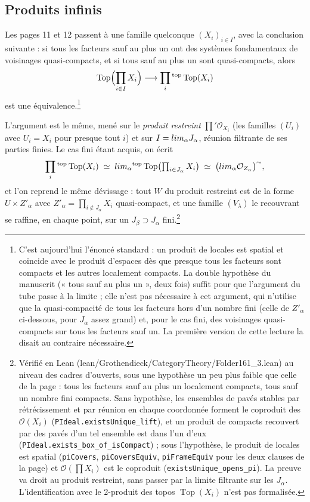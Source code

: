 \documentclass[11pt,a4paper]{article}
\begin{document}
\subsection*{Produits infinis}

Les pages 11 et 12 passent à une famille quelconque $(X_{i})_{i \in I}$, avec
la conclusion suivante : si tous les facteurs sauf au plus un ont des systèmes
fondamentaux de voisinages quasi-compacts, et si tous sauf au plus un sont
quasi-compacts, alors
\[
\operatorname{Top}\Bigl(\prod_{i \in I} X_{i}\Bigr) \longrightarrow
\prod_{i}{}^{\mathrm{top}} \operatorname{Top}(X_{i})
\]
est une équivalence.\footnote{C'est aujourd'hui l'énoncé standard : un produit
de locales est spatial et coïncide avec le produit d'espaces dès que presque
tous les facteurs sont compacts et les autres localement compacts. La double
hypothèse du manuscrit (« tous sauf au plus un », deux fois) suffit pour que
l'argument du tube passe à la limite ; elle n'est pas nécessaire à cet
argument, qui n'utilise que la quasi-compacité de tous les facteurs hors d'un
nombre fini (celle de $Z'_{\alpha}$ ci-dessous, pour $J_{\alpha}$ assez grand)
et, pour le cas fini, des voisinages quasi-compacts sur tous les facteurs
sauf un. La première version de cette lecture la disait au contraire
nécessaire.}

L'argument est le même, mené sur le \emph{produit restreint}
$\prod' \mathcal{O}_{X_{i}}$ (les familles $(U_{i})$ avec $U_{i} = X_{i}$ pour
presque tout $i$) et sur $I = \varinjlim_{\alpha} J_{\alpha}$, réunion filtrante
de ses parties finies. Le cas fini étant acquis, on écrit
\[
\prod_{i}{}^{\mathrm{top}} \operatorname{Top}(X_{i})
\;\simeq\; \varprojlim_{\alpha}{}^{\mathrm{top}}
\operatorname{Top}\bigl(\textstyle\prod_{i \in J_{\alpha}} X_{i}\bigr)
\;\simeq\; \bigl(\varinjlim_{\alpha} \mathcal{O}_{Z_{\alpha}}\bigr)^{\sim},
\]
et l'on reprend le même dévissage : tout $W$ du produit restreint est de la
forme $U \times Z'_{\alpha}$ avec $Z'_{\alpha} = \prod_{i \notin J_{\alpha}} X_{i}$
quasi-compact, et une famille $(V_{\lambda})$ le recouvrant se raffine, en
chaque point, sur un $J_{\beta} \supset J_{\alpha}$ fini.\footnote{Vérifié en
Lean (lean/Grothendieck/CategoryTheory/Folder161\_3.lean) au niveau des cadres d'ouverts,
sous une hypothèse un peu plus faible que celle de la page : tous les facteurs
sauf au plus un localement compacts, tous sauf un nombre fini compacts. Sans
hypothèse, les ensembles de pavés stables par rétrécissement et par réunion
en chaque coordonnée forment le coproduit des $\mathcal{O}(X_i)$
(\texttt{PIdeal.existsUnique\_lift}), et un produit de compacts recouvert
par des pavés d'un tel ensemble est dans l'un d'eux
(\texttt{PIdeal.exists\_box\_of\_isCompact}) ; sous l'hypothèse, le produit
de locales est spatial (\texttt{piCovers}, \texttt{piCoversEquiv},
\texttt{piFrameEquiv} pour les deux clauses de la page) et
$\mathcal{O}(\prod X_i)$ est le coproduit (\texttt{existsUnique\_opens\_pi}).
La preuve va droit au produit restreint, sans passer par la limite filtrante
sur les $J_{\alpha}$. L'identification avec le 2-produit des topos
$\operatorname{Top}(X_i)$ n'est pas formalisée.}
\end{document}
